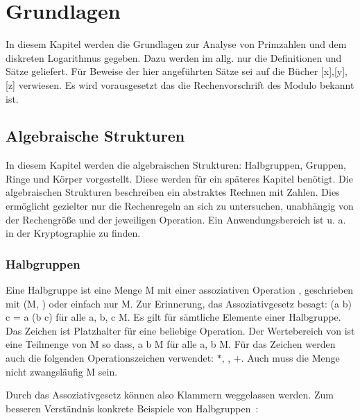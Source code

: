 \section{Grundlagen}
	In diesem Kapitel werden die Grundlagen zur Analyse von Primzahlen und dem diskreten Logarithmus gegeben. Dazu werden im allg. nur die Definitionen und Sätze geliefert. Für Beweise der hier angeführten Sätze sei auf die Bücher [x],[y],[z] verwiesen. Es wird vorausgesetzt das die Rechenvorschrift des Modulo bekannt ist.
	
	
	\subsection{Algebraische Strukturen}
		In diesem Kapitel werden die algebraischen Strukturen: Halbgruppen, Gruppen, Ringe und Körper vorgestellt. Diese werden für ein späteres Kapitel benötigt. Die algebraischen Strukturen beschreiben ein abstraktes Rechnen mit Zahlen. Dies ermöglicht gezielter nur die Rechenregeln an sich zu untersuchen, unabhängig von der Rechengröße und der jeweiligen Operation. Ein Anwendungsbereich ist u. a. in der Kryptographie zu finden.~\cite{Kryptographie:und:Algorithmen}
	
		\subsubsection{Halbgruppen}
			Eine Halbgruppe ist eine Menge M mit einer assoziativen Operation \mycircOhne, geschrieben mit (M, \mycircOhne) oder einfach nur M. Zur Erinnerung, das Assoziativgesetz besagt: (a \mycirc b) \mycirc c = a \mycirc (b \mycirc c) für alle a, b, c \myin M. Es gilt für sämtliche Elemente einer Halbgruppe. Das Zeichen \mycirc ist Platzhalter für eine beliebige Operation. Der Wertebereich von \mycirc ist eine Teilmenge von M so dass, a \mycirc b \myin M für alle a, b \myin M. Für das Zeichen \mycirc werden auch die folgenden Operationszeichen verwendet: $*$, \mycdotOhne, +. Auch muss die Menge nicht zwangsläufig M sein.~\cite{Erste:Hilfe:in:Linearer:Algebra}
			
			Durch das Assoziativgesetz können also Klammern weggelassen werden. Zum besseren Verständnis konkrete Beispiele von Halbgruppen~\cite{Erste:Hilfe:in:Linearer:Algebra}:
			
